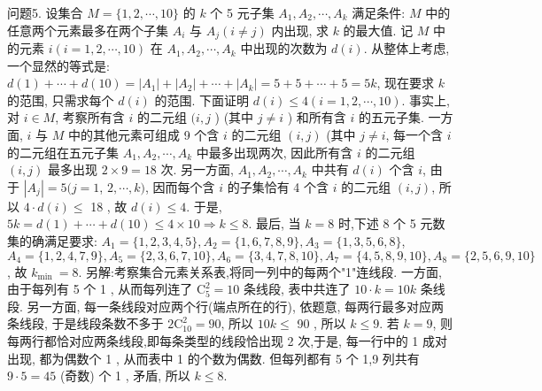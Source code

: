 问题5. 设集合 $M=\{1,2, \cdots, 10\}$ 的 $k$ 个 5 元子集 $A_1, A_2, \cdots, A_k$ 满足条件: $M$ 中的任意两个元素最多在两个子集 $A_i$ 与 $A_j(i \neq j)$ 内出现, 求 $k$ 的最大值.
记 $M$ 中的元素 $i(i=1,2, \cdots, 10)$ 在 $A_1, A_2, \cdots, A_k$ 中出现的次数为 $d(i)$.
从整体上考虑, 一个显然的等式是: $d(1)+\cdots+d(10)=\left|A_1\right|+\left|A_2\right|+\cdots+ \left|A_k\right|=5+5+\cdots+5=5 k$, 现在要求 $k$ 的范围, 只需求每个 $d(i)$ 的范围.
下面证明 $d(i) \leqslant 4(i=1,2, \cdots, 10)$.
事实上, 对 $i \in M$, 考察所有含 $i$ 的二元组 $(i, j$ ) (其中 $j \neq i$ ) 和所有含 $i$ 的五元子集.
一方面, $i$ 与 $M$ 中的其他元素可组成 9 个含 $i$ 的二元组 $(i, j)$ (其中 $j \neq i$, 每一个含 $i$ 的二元组在五元子集 $A_1, A_2, \cdots, A_k$ 中最多出现两次, 因此所有含 $i$ 的二元组 $(i, j)$ 最多出现 $2 \times 9=18$ 次.
另一方面, $A_1, A_2, \cdots, A_k$ 中共有 $d(i)$ 个含 $i$, 由于 $\left|A_j\right|=5(j=1$,
$2, \cdots, k)$, 因而每个含 $i$ 的子集恰有 4 个含 $i$ 的二元组 $(i, j)$, 所以 $4 \cdot d(i) \leqslant$ 18 , 故 $d(i) \leqslant 4$.
于是, $5 k=d(1)+\cdots+d(10) \leqslant 4 \times 10 \Rightarrow k \leqslant 8$.
最后, 当 $k=8$ 时,下述 8 个 5 元数集的确满足要求:
$A_1=\{1,2,3,4,5\}, A_2=\{1,6,7,8,9\}, A_3=\{1,3,5,6,8\}$, $A_4=\{1,2,4,7,9\}, A_5=\{2,3,6,7,10\}, A_6=\{3,4,7,8,10\}, A_7= \{4,5,8,9,10\}, A_8=\{2,5,6,9,10\}$, 故 $k_{\text {min }}=8$.
另解:考察集合元素关系表,将同一列中的每两个"1"连线段.
一方面, 由于每列有 5 个 1 , 从而每列连了 $\mathrm{C}_5^2=10$ 条线段, 表中共连了 $10 \cdot k=10 k$ 条线段.
另一方面, 每一条线段对应两个行(端点所在的行), 依题意, 每两行最多对应两条线段, 于是线段条数不多于 $2 \mathrm{C}_{10}^2=90$, 所以 $10 k \leqslant$ 90 , 所以 $k \leqslant 9$.
若 $k=9$, 则每两行都恰对应两条线段,即每条类型的线段恰出现 2 次,于是, 每一行中的 1 成对出现, 都为偶数个 1 , 从而表中 1 的个数为偶数.
但每列都有 5 个 1,9 列共有 $9 \cdot 5=45$ (奇数) 个 1 , 矛盾, 所以 $k \leqslant 8$.



